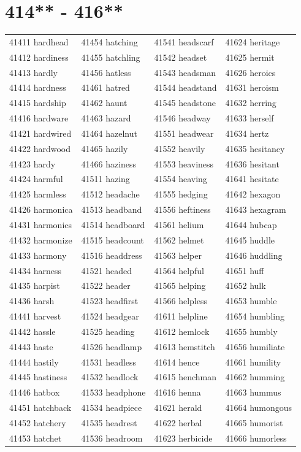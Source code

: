 \documentclass[10pt, oneside]{book}
\begin{document}
\begin{table}
	\centering
	\section*{414** - 416**}
	\begin{tabular}{l l l l}
41411 hardhead &41454 hatching &41541 headscarf &41624 heritage\\
41412 hardiness &41455 hatchling &41542 headset &41625 hermit\\
41413 hardly &41456 hatless &41543 headsman &41626 heroics\\
41414 hardness &41461 hatred &41544 headstand &41631 heroism\\
41415 hardship &41462 haunt &41545 headstone &41632 herring\\
41416 hardware &41463 hazard &41546 headway &41633 herself\\
41421 hardwired &41464 hazelnut &41551 headwear &41634 hertz\\
41422 hardwood &41465 hazily &41552 heavily &41635 hesitancy\\
41423 hardy &41466 haziness &41553 heaviness &41636 hesitant\\
41424 harmful &41511 hazing &41554 heaving &41641 hesitate\\
41425 harmless &41512 headache &41555 hedging &41642 hexagon\\
41426 harmonica &41513 headband &41556 heftiness &41643 hexagram\\
41431 harmonics &41514 headboard &41561 helium &41644 hubcap\\
41432 harmonize &41515 headcount &41562 helmet &41645 huddle\\
41433 harmony &41516 headdress &41563 helper &41646 huddling\\
41434 harness &41521 headed &41564 helpful &41651 huff\\
41435 harpist &41522 header &41565 helping &41652 hulk\\
41436 harsh &41523 headfirst &41566 helpless &41653 humble\\
41441 harvest &41524 headgear &41611 helpline &41654 humbling\\
41442 hassle &41525 heading &41612 hemlock &41655 humbly\\
41443 haste &41526 headlamp &41613 hemstitch &41656 humiliate\\
41444 hastily &41531 headless &41614 hence &41661 humility\\
41445 hastiness &41532 headlock &41615 henchman &41662 humming\\
41446 hatbox &41533 headphone &41616 henna &41663 hummus\\
41451 hatchback &41534 headpiece &41621 herald &41664 humongous\\
41452 hatchery &41535 headrest &41622 herbal &41665 humorist\\
41453 hatchet &41536 headroom &41623 herbicide &41666 humorless\\
	\end{tabular}
 \end{table}
\clearpage
\end{document}

